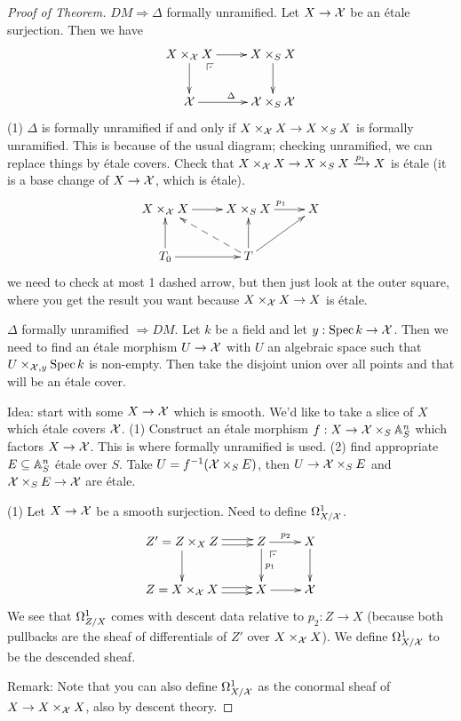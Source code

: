  \begin{proof}[Proof of Theorem]
   $DM\Rightarrow \Delta$ formally unramified. Let $X\to \X$ be an \'etale surjection.
   Then we have
   \[\xymatrix{
    X\times_\X X \ar[r] \ar[d]\ar@{}[dr]|(.25)\pb & X\times_S X \ar[d]\\
    \X\ar[r]^\Delta & \X\times_S \X
   }\]
    (1) $\Delta$ is formally unramified if and only if $X\times_\X X\to X\times_S X$ is
   formally unramified. This is because of the usual diagram; checking unramified, we can
   replace things by \'etale covers. Check that $X\times_\X X \to X\times_S
   X\xrightarrow{p_1} X$ is \'etale (it is a base change of $X\to \X$, which is \'etale).
   \[\xymatrix{
    X\times_\X X\ar[r] & X\times_S X\ar[r]^{p_1} & X\\
    T_0\ar[u]\ar[r] & T\ar[u]\ar[ur]\ar@{-->}[ul]
   }\]
   we need to check at most 1 dashed arrow, but then just look at the outer square, where
   you get the result you want because $X\times_\X X\to X$ is \'etale.

   $\Delta$ formally unramified $\Rightarrow DM$. Let $k$ be a field and let $y:\spec
   k\to \X$. Then we need to find an \'etale morphism $U\to \X$ with $U$ an algebraic
   space such that $U\times_{\X,y}\spec k$ is non-empty. Then take the disjoint union
   over all points and that will be an \'etale cover.

   Idea: start with some $X\to \X$ which is smooth. We'd like to take a slice of $X$
   which \'etale covers $\X$. (1) Construct an \'etale morphism $f:X\to \X\times_S
   \AA^n_S$ which factors $X\to \X$. This is where formally unramified is used. (2) find
   appropriate $E\subseteq \AA^n_S$ \'etale over $S$. Take $U=f^{-1}(\X\times_S E)$, then
   $U\to \X\times_S E$ and $\X\times_S E\to \X$ are \'etale.

   (1) Let $X\to \X$ be a smooth surjection. Need to define $\Om^1_{X/\X}$.
   \[\xymatrix{
    Z'=Z\times_X Z\ar[d]\ar@<.5ex>[r]\ar@<-.5ex>[r]& Z\ar[r]^{p_2}\ar[d]^{p_1}\ar@{}[dr]|(.25)\pb & X\ar[d]\\
    Z=X\times_\X X \ar@<.5ex>[r]\ar@<-.5ex>[r]&X\ar[r] & \X
   }\]
    We see that $\Om^1_{Z/X}$ comes with descent data relative to $p_2:Z\to X$ (because
   both pullbacks are the sheaf of differentials of $Z'$ over $X\times_\X X$). We define
   $\Om^1_{X/\X}$ to be the descended sheaf.

   Remark: Note that you can also define $\Om^1_{X/\X}$ as the conormal sheaf of $X\to
   X\times_\X X$, also by descent theory.


\end{proof}
